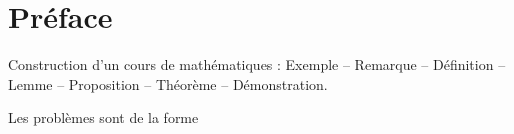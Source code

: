 
\chapter*{Préface}

Construction d'un cours de mathématiques : Exemple -- Remarque -- Définition -- Lemme -- Proposition -- Théorème -- Démonstration.

Les problèmes sont de la forme
